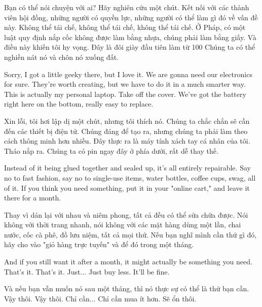 \documentclass[a4paper]{article}
\begin{document}
	\begin{vietnamese-v2}
		[Chloe] Bạn có thể nói chuyện với ai? Hãy nghiên cứu một chút.
		Kết nối với các thành viên hội đồng, những người có quyền lực, những người có thể làm gì đó về vấn đề này.
		Không thể tái chế, không thể tái chế, không thể tái chế.
		Ở Pháp, có một luật quy định nắp cốc không được làm bằng nhựa, chúng phải làm bằng giấy.
		Và điều này khiến tôi hy vọng.
		Đây là đôi giày đầu tiên làm từ 100%
		Chúng ta có thể nghiền nát nó và chôn nó xuống đất.
	\end{vietnamese-v2}
	
	
	Sorry, I got a little geeky there, but I love it.
	We are gonna need our electronics for sure.
	They're worth creating, but we have to do it in a much smarter way.
	This is actually my personal laptop.
	Take off the cover.
	We've got the battery right here on the bottom, really easy to replace.
	
	\begin{vietnamese-v2}
		Xin lỗi, tôi hơi lập dị một chút, nhưng tôi thích nó.
		Chúng ta chắc chắn sẽ cần đến các thiết bị điện tử.
		Chúng đáng để tạo ra, nhưng chúng ta phải làm theo cách thông minh hơn nhiều.
		Đây thực ra là máy tính xách tay cá nhân của tôi.
		Tháo nắp ra.
		Chúng ta có pin ngay đây ở phía dưới, rất dễ thay thế.
	\end{vietnamese-v2}
	
	Instead of it being glued together and sealed up, it's all entirely repairable.
	Say no to fast fashion, say no to single-use items, water bottles, coffee cups, swag, all of it.
	If you think you need something, put it in your "online cart," and leave it there for a month.
	
	\begin{vietnamese-v2}
		Thay vì dán lại với nhau và niêm phong, tất cả đều có thể sửa chữa được.
		Nói không với thời trang nhanh, nói không với các mặt hàng dùng một lần, chai nước, cốc cà phê, đồ lưu niệm, tất cả mọi thứ.
		Nếu bạn nghĩ mình cần thứ gì đó, hãy cho vào "giỏ hàng trực tuyến" và để đó trong một tháng.
	\end{vietnamese-v2}
	
	And if you still want it after a month, it might actually be something you need.
	That's it. That's it. Just... Just buy less.
	It'll be fine.
	
	\begin{vietnamese-v2}
		Và nếu bạn vẫn muốn nó sau một tháng, thì nó thực sự có thể là thứ bạn cần.
		Vậy thôi. Vậy thôi. Chỉ cần... Chỉ cần mua ít hơn.
		Sẽ ổn thôi.
	\end{vietnamese-v2}
	
\end{document}
